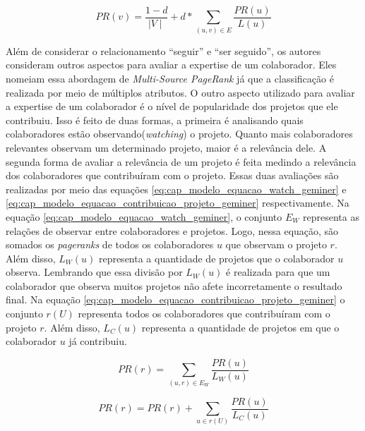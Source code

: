 \begin{equation}
\label{eq:cap_modelo_equacao1_geminer}
PR(v) =  \frac{1-d}{\mid V \mid} + d *  \sum_{(u,v) \in E}  \frac{PR(u)}{L(u)}
\end{equation}

Além de considerar o relacionamento ``seguir'' e ``ser seguido'', os autores consideram outros aspectos para avaliar a expertise de um colaborador. Eles nomeiam essa abordagem de \textit{Multi-Source PageRank} já que a classificação é realizada por meio de múltiplos atributos.   O outro aspecto utilizado para avaliar a expertise de um colaborador é o nível de popularidade dos projetos que ele contribuiu. Isso é feito de duas formas, a primeira é analisando quais colaboradores estão observando(\textit{watching}) o projeto. Quanto mais colaboradores relevantes observam um determinado projeto, maior é a relevância dele. A segunda forma de avaliar a relevância de um projeto é feita medindo a relevância dos colaboradores que contribuíram com o projeto.  Essas duas avaliações são realizadas por meio das equações \ref{eq:cap_modelo_equacao_watch_geminer} e \ref{eq:cap_modelo_equacao_contribuicao_projeto_geminer}  respectivamente. Na equação \ref{eq:cap_modelo_equacao_watch_geminer}, o conjunto $E_W$ representa as relações de observar entre colaboradores e projetos. Logo, nessa equação, são somados os \textit{pageranks} de todos os colaboradores $u$ que  observam o projeto $r$. Além disso, $L_W(u)$ representa a quantidade de projetos que o colaborador $u$ observa. Lembrando que essa divisão por  $L_W(u)$ é realizada para que um colaborador que observa muitos projetos não afete incorretamente o resultado final.  Na equação \ref{eq:cap_modelo_equacao_contribuicao_projeto_geminer} o conjunto $r(U)$ representa todos os colaboradores que contribuíram com o projeto $r$. Além disso, $L_C(u)$ representa a quantidade de projetos em que o colaborador $u$ já contribuiu.








\begin{equation}
\label{eq:cap_modelo_equacao_watch_geminer}
PR(r) =    \sum_{(u,r) \in E_W}  \frac{PR(u)}{L_W(u)}
\end{equation}

\begin{equation}
\label{eq:cap_modelo_equacao_contribuicao_projeto_geminer}
PR(r) = PR(r) +    \sum_{u  \in r(U) }  \frac{PR(u)}{L_C(u)}
\end{equation}

